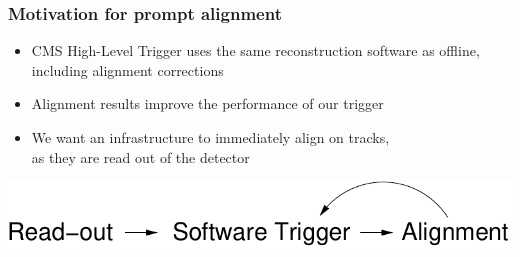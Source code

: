 \documentclass[compress]{beamer}
\begin{document}
\begin{frame}
\frametitle{Motivation for prompt alignment}
\begin{itemize}\setlength{\itemsep}{0.75 cm}
\item CMS High-Level Trigger uses the same reconstruction software as offline, including alignment corrections

\item Alignment results improve the performance of our trigger

\item We want an infrastructure to immediately align on tracks, \\ as they are read out of the detector
\end{itemize}
\begin{center}
\includegraphics[width=8 cm]{readout.pdf}
\end{center}
\end{frame}
\end{document}
